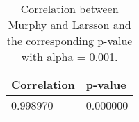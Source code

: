 \documentclass[a4paper,10pt]{article}
\begin{document}
\begin{table}
\centering
\begin{tabular}{ll}
\toprule
Correlation & p-value \\
\midrule
\num{0.998970} & \num{0.000000} \\
\bottomrule
\end{tabular}
\caption{Correlation between Murphy and Larsson and the corresponding p-value with alpha = 0.001.}
\label{table:table:measurements:murphyvslarsson}
\end{table}
\end{document}

